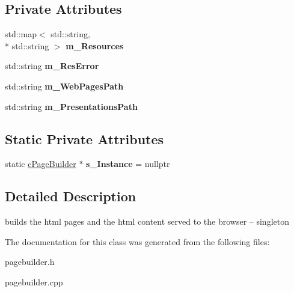 \subsection*{Private Attributes}
\begin{DoxyCompactItemize}
\item 
\hypertarget{classhttp__server_1_1cPageBuilder_aab5bd8d3bf0b336cfe4f4334f3c78126}{std\-::map$<$ std\-::string, \\*
std\-::string $>$ {\bfseries m\-\_\-\-Resources}}\label{classhttp__server_1_1cPageBuilder_aab5bd8d3bf0b336cfe4f4334f3c78126}

\item 
\hypertarget{classhttp__server_1_1cPageBuilder_a1e7149f083b7160ded75e7c8ab704d5d}{std\-::string {\bfseries m\-\_\-\-Res\-Error}}\label{classhttp__server_1_1cPageBuilder_a1e7149f083b7160ded75e7c8ab704d5d}

\item 
\hypertarget{classhttp__server_1_1cPageBuilder_a089df9d19395f4913b923811ccce4811}{std\-::string {\bfseries m\-\_\-\-Web\-Pages\-Path}}\label{classhttp__server_1_1cPageBuilder_a089df9d19395f4913b923811ccce4811}

\item 
\hypertarget{classhttp__server_1_1cPageBuilder_ab3462b34291267c6c0a66bca5f966914}{std\-::string {\bfseries m\-\_\-\-Presentations\-Path}}\label{classhttp__server_1_1cPageBuilder_ab3462b34291267c6c0a66bca5f966914}

\end{DoxyCompactItemize}
\subsection*{Static Private Attributes}
\begin{DoxyCompactItemize}
\item 
\hypertarget{classhttp__server_1_1cPageBuilder_a5857987a8133c3768bac833850d12613}{static \hyperlink{classhttp__server_1_1cPageBuilder}{c\-Page\-Builder} $\ast$ {\bfseries s\-\_\-\-Instance} = nullptr}\label{classhttp__server_1_1cPageBuilder_a5857987a8133c3768bac833850d12613}

\end{DoxyCompactItemize}


\subsection{Detailed Description}
builds the html pages and the html content served to the browser -- singleton 

The documentation for this class was generated from the following files\-:\begin{DoxyCompactItemize}
\item 
pagebuilder.\-h\item 
pagebuilder.\-cpp\end{DoxyCompactItemize}
